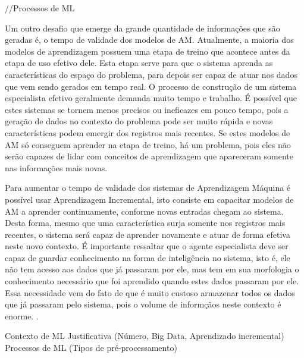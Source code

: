 //Processos de ML

Um outro desafio que emerge da grande quantidade de informações que são geradas é, o tempo de validade dos modelos de AM. Atualmente, a maioria dos modelos de aprendizagem possuem uma etapa de treino que acontece antes da etapa de uso efetivo dele. Esta etapa serve para que o sistema aprenda as características do espaço do problema, para depois ser capaz de atuar nos dados que vem sendo gerados em tempo real. 
O processo de construção de um sistema especialista efetivo geralmente demanda muito tempo e trabalho. É possível que estes sistemas se tornem menos precisos ou ineficazes em pouco tempo, pois a geração de dados no contexto do problema pode ser muito rápida e novas características podem emergir dos registros mais recentes. Se estes modelos de AM só conseguem aprender na etapa de treino, há um problema, pois eles não serão capazes de lidar com conceitos de aprendizagem que apareceram somente nas informações mais novas. 

Para aumentar o tempo de validade dos sistemas de Aprendizagem Máquina é possível usar Aprendizagem Incremental, isto consiste em capacitar modelos de AM a aprender continuamente, conforme novas entradas chegam ao sistema. Desta forma, mesmo que uma característica surja somente nos registros mais recentes, o sistema será capaz de aprender novamente e atuar de forma efetiva neste novo contexto. É importante ressaltar que o agente especialista deve ser capaz de guardar conhecimento na forma de inteligência no sistema, isto é, ele não tem acesso aos dados que já passaram por ele, mas tem em sua morfologia o conhecimento necessário que foi aprendido quando estes dados passaram por ele. Essa necessidade vem do fato de que é muito custoso armazenar todos os dados que já passaram pelo sistema, pois o volume de informçãos neste contexto é enorme. \cite{incremental2011}.




Contexto de ML
Justificativa (Número, Big Data, Aprendizado incremental)
Processos de ML (Tipos de pré-processamento)

